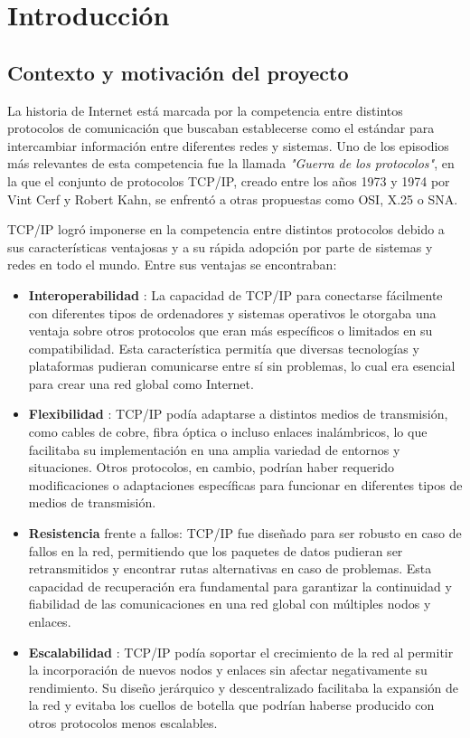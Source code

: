 \chapter{Introducción}
\section{Contexto y motivación del proyecto}

La historia de Internet está marcada por la competencia entre distintos protocolos de comunicación que buscaban establecerse
como el estándar para intercambiar información entre diferentes redes y sistemas. Uno de los episodios más relevantes de esta
competencia fue la llamada \textit{"Guerra de los protocolos"}\cite{protocol_wars-wiki}, en la que el conjunto de protocolos TCP/IP, creado entre los
años 1973 y 1974 por Vint Cerf y Robert Kahn\cite{protocolo-control-transimision-wiki}, se enfrentó a otras propuestas como OSI, X.25 o SNA.

TCP/IP logró imponerse en la competencia entre distintos protocolos debido a sus características ventajosas y a su rápida adopción por parte de sistemas y redes en todo el mundo. Entre sus ventajas se encontraban:
\begin{itemize}
      \item \textbf{ Interoperabilidad }: La capacidad de TCP/IP para conectarse fácilmente con diferentes tipos de ordenadores y sistemas operativos le otorgaba una ventaja sobre otros protocolos que eran más específicos o limitados en su compatibilidad. Esta característica permitía que diversas tecnologías y plataformas pudieran comunicarse entre sí sin problemas, lo cual era esencial para crear una red global como Internet.

      \item \textbf{ Flexibilidad }: TCP/IP podía adaptarse a distintos medios de transmisión, como cables de cobre, fibra óptica o incluso enlaces inalámbricos, lo que facilitaba su implementación en una amplia variedad de entornos y situaciones. Otros protocolos, en cambio, podrían haber requerido modificaciones o adaptaciones específicas para funcionar en diferentes tipos de medios de transmisión.

      \item \textbf{ Resistencia } frente a fallos: TCP/IP fue diseñado para ser robusto en caso de fallos en la red, permitiendo que los paquetes de datos pudieran ser retransmitidos y encontrar rutas alternativas en caso de problemas. Esta capacidad de recuperación era fundamental para garantizar la continuidad y fiabilidad de las comunicaciones en una red global con múltiples nodos y enlaces.

      \item \textbf{ Escalabilidad }: TCP/IP podía soportar el crecimiento de la red al permitir la incorporación de nuevos nodos y enlaces sin afectar negativamente su rendimiento. Su diseño jerárquico y descentralizado facilitaba la expansión de la red y evitaba los cuellos de botella que podrían haberse producido con otros protocolos menos escalables.

\end{itemize}

